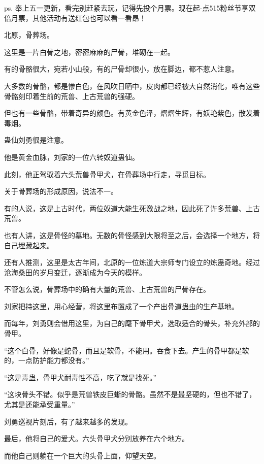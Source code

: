 
\begin{this_body}



ps. 奉上五一更新，看完别赶紧去玩，记得先投个月票。现在起-点515粉丝节享双倍月票，其他活动有送红包也可以看一看昂！

北原，骨葬场。

这里是一片白骨之地，密密麻麻的尸骨，堆砌在一起。

有的骨骼很大，宛若小山般，有的尸骨却很小，放在脚边，都不惹人注意。

大多数的骨骼，都是惨白色，在风吹日晒中，皮肉都已经被大自然消化，唯有这些骨骼刻印着生前的荒兽、上古荒兽的强硬。

但也有一些骨骼，带着奇异的颜色。有黄金色泽，熠熠生辉，有妖艳紫色，散发着毒烟。

蛊仙刘勇很是注意。

他是黄金血脉，刘家的一位六转奴道蛊仙。

此刻，他正驾驭着六头荒兽骨甲犬，在骨葬场中行走，寻觅目标。

关于骨葬场的形成原因，说法不一。

有的人说，这是上古时代，两位奴道大能生死激战之地，因此死了许多荒兽、上古荒兽。

也有人讲，这是骨怪的墓地。无数的骨怪感到大限将至之后，会选择一个地方，将自己埋藏起来。

还有人推测，这里是太古年间，北原的一位炼道大宗师专门设立的炼蛊奇地。经过沧海桑田的岁月变迁，逐渐成为今天的模样。

不管怎么说，骨葬场中的确有大量的荒兽、上古荒兽的尸骨存在。

刘家把持这里，用心经营，将这里布置成了一个产出骨道蛊虫的生产基地。

而每年，刘勇则会借用这里，为自己的麾下骨甲犬，选取适合的骨头，补充外部的骨甲。

“这个白骨，好像是蛇骨，而且是软骨，不能用。吞食下去。产生的骨甲都是软的，一点防护能力都没有。”

“这是毒蛊，骨甲犬耐毒性不高，吃了就是找死。”

“这块骨头不错。似乎是荒兽铁皮巨蜥的骨骼。虽然不是最坚硬的，但也不错了，尤其是还能承受重量。”

刘勇巡视片刻后，有了越来越多的发现。

最后，他将自己的爱犬。六头骨甲犬分别放养在六个地方。

而他自己则躺在一个巨大的头骨上面，仰望天空。


\end{this_body}
